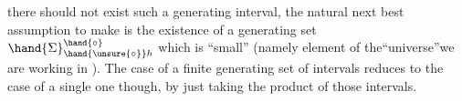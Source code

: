 there should not exist such a generating interval,  the natural next best
assumption to make is the existence of a generating set $\hand{\Sigma}_{\hand{\unsure{\circ}}h}^{\hand{\circ}}$ which is
``small''  (namely  element of the``universe''we are working  in ).  The
case of a finite generating set of intervals reduces to the case of a
single one though,  by just
taking the product of those intervals.

